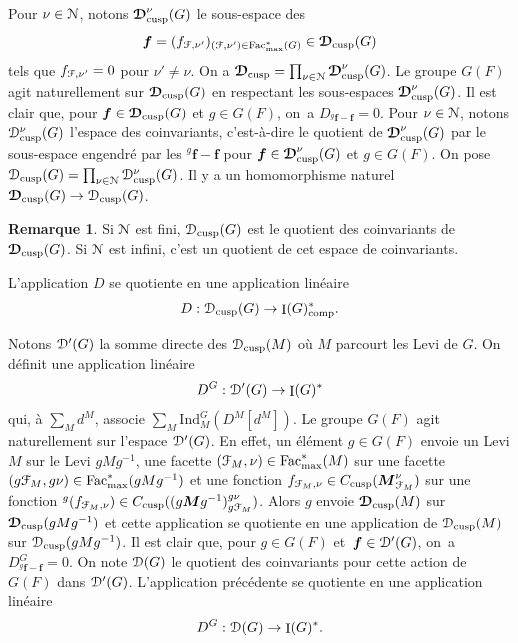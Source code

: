 \documentclass[11pt]{article}
\numberwithin{equation}{section}\providecommand{\og}{«\,}\providecommand{\fg}{\,»}
\let\mathcal \EuScript
\newcommand{\comp}{\mathrm{comp}}
\newcommand{\cusp}{\mathrm{cusp}}
\newcommand{\Fac}{\mathrm{Fac}}
\newcommand{\Ind}{\mathrm{Ind}}
\DeclareMathOperator{\rI}{I}
\newcommand{\bmf}{\boldsymbol{f}}
\newcommand{\gbmf}{{}^g\!\boldsymbol{f}}
\newcommand{\bM}{\boldsymbol{M}}
\newcommand{\cD}{\mathcal{D}}
\newcommand{\cF}{\mathcal{F}}
\newcommand{\cN}{\mathcal{N}}
\theoremstyle{plain}
\theoremstyle{definition}
\newtheorem*{rem*}{Remarque}
\begin{document}
Pour $\nu\in \cN$, notons $\boldsymbol{\cD}^{\nu}_{\cusp}(G)$ le sous-espace des
\[
\bmf=(f_{\cF,\nu'})_{(\cF,\nu')\in \Fac^*_{\max}(G)}\in \boldsymbol{\cD}_{\cusp}(G)
\]
tels que $f_{\cF,\nu'}=0$ pour $\nu'\neq\nu$. On a $\boldsymbol{\cD}_{\cusp}=\prod_{\nu\in \cN}\boldsymbol{\cD}^{\nu}_{\cusp}(G)$.
Le groupe $G(F)$ agit naturellement sur $\boldsymbol{\cD}_{\cusp}(G)$ en respectant les sous-espaces $\boldsymbol{\cD}_{\cusp}^{\nu}(G)$. Il est clair que, pour $\bmf\in \boldsymbol{\cD}_{\cusp}(G)$ et $g\in G(F)$, on~a $D_{{\gbmf}-\bmf}=0$. Pour $\nu\in \cN$, notons $\cD^{\nu}_{\cusp}(G)$ l'espace des coinvariants, c'est-à-dire le quotient de $\boldsymbol{\cD}^{\nu}_{\cusp}(G)$ par le sous-espace engendré par les ${\gbmf}-\bmf$ pour $\bmf\in \boldsymbol{\cD}^{\nu}_{\cusp}(G)$ et $g\in G(F)$. On pose $\cD_{\cusp}(G)=\prod_{\nu\in \cN}\cD^{\nu}_{\cusp}(G)$. Il y a un homomorphisme naturel $\boldsymbol{\cD}_{\cusp}(G)\to\cD_{\cusp}(G)$.

\begin{rem*}
Si $\cN$ est fini, $\cD_{\cusp}(G)$ est le quotient des coinvariants de $\boldsymbol{\cD}_{\cusp}(G)$. Si $\cN$ est infini, c'est un quotient de cet espace de coinvariants.
\end{rem*}

L'application $D$ se quotiente en une application linéaire
\[
D:\cD_{\cusp}(G)\to \rI(G)_{\comp}^*.
\]

Notons $\cD'(G)$ la somme directe des $\cD_{\cusp}(M)$ où $M$ parcourt les Levi de $G$. On définit une application linéaire
\[
D^G: \cD'(G)\to \rI(G)^*
\]
qui, à $\sum_{M}d^M$, associe $\sum_{M}\Ind_{M}^G(D^M[d^M])$.
Le groupe $G(F)$ agit naturellement sur l'espace $\cD'(G)$. En effet, un élément $g\in G(F)$ envoie un Levi $M$ sur le Levi $gMg^{-1}$, une facette $(\cF_{M},\nu)\in \Fac^*_{\max}(M)$ sur une facette $(g\cF_{M},g\nu)\in \Fac^*_{\max}(gMg^{-1})$ et une fonction $f_{\cF_{M},\nu}\in C_{\cusp}(\bM_{\cF_{M}}^{\nu})$ sur une fonction $^g(f_{\cF_{M},\nu})\in C_{\cusp}(({g\bM g^{-1}})_{g\cF_{M}}^{g\nu})$. Alors $g$ envoie $\boldsymbol{\cD}_{\cusp}(M)$ sur $\boldsymbol{\cD}_{\cusp}(gMg^{-1})$ et cette application se quotiente en une application de $\cD_{\cusp}(M)$ sur $\cD_{\cusp}(gMg^{-1})$.
Il est clair que, pour $g\in G(F)$ et~\hbox{$\bmf\in \cD'(G)$}, on~a $D^G_{{\gbmf}-\bmf}=0$. On note $\cD(G)$ le quotient des coinvariants pour cette action de $G(F)$ dans $\cD'(G)$. L'application précédente se quotiente en une application linéaire
\[
D^G:\cD(G)\to \rI(G)^*.
\]
\end{document}
